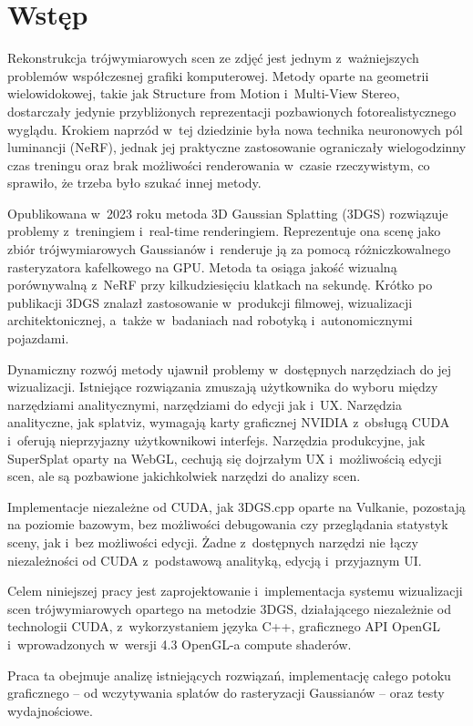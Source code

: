 \chapter*{Wstęp}

Rekonstrukcja trójwymiarowych scen ze zdjęć jest jednym z~ważniejszych
problemów współczesnej grafiki komputerowej. Metody oparte na geometrii
wielowidokowej, takie jak Structure from Motion i~Multi-View Stereo,
dostarczały jedynie przybliżonych reprezentacji pozbawionych
fotorealistycznego wyglądu. Krokiem naprzód w~tej dziedzinie była nowa
technika neuronowych pól luminancji (NeRF), jednak jej praktyczne
zastosowanie ograniczały wielogodzinny czas treningu oraz brak możliwości
renderowania w~czasie rzeczywistym, co sprawiło, że trzeba było szukać innej
metody.

Opublikowana w~2023 roku metoda 3D Gaussian Splatting (3DGS) rozwiązuje
problemy z~treningiem i~real-time renderingiem. Reprezentuje ona scenę jako
zbiór trójwymiarowych Gaussianów i~renderuje ją za pomocą różniczkowalnego
rasteryzatora kafelkowego na GPU. Metoda ta osiąga jakość wizualną
porównywalną z~NeRF przy kilkudziesięciu klatkach na sekundę. Krótko po
publikacji 3DGS znalazł zastosowanie w~produkcji filmowej, wizualizacji
architektonicznej, a~także w~badaniach nad robotyką i~autonomicznymi
pojazdami.

Dynamiczny rozwój metody ujawnił problemy w~dostępnych narzędziach do jej
wizualizacji. Istniejące rozwiązania zmuszają użytkownika do wyboru między
narzędziami analitycznymi, narzędziami do edycji jak i~UX. Narzędzia
analityczne, jak splatviz, wymagają karty graficznej NVIDIA z~obsługą CUDA
i~oferują nieprzyjazny użytkownikowi interfejs. Narzędzia produkcyjne, jak
SuperSplat oparty na WebGL, cechują się dojrzałym UX i~możliwością edycji
scen, ale są pozbawione jakichkolwiek narzędzi do analizy scen.

Implementacje niezależne od CUDA, jak 3DGS.cpp oparte na Vulkanie, pozostają
na poziomie bazowym, bez możliwości debugowania czy przeglądania statystyk
sceny, jak i~bez możliwości edycji. Żadne z~dostępnych narzędzi nie łączy
niezależności od CUDA z~podstawową analityką, edycją i~przyjaznym UI.

Celem niniejszej pracy jest zaprojektowanie i~implementacja systemu
wizualizacji scen trójwymiarowych opartego na metodzie 3DGS, działającego
niezależnie od technologii CUDA, z~wykorzystaniem języka C++, graficznego
API OpenGL i~wprowadzonych w~wersji 4.3 OpenGL-a compute shaderów.

Praca ta obejmuje analizę istniejących rozwiązań, implementację całego
potoku graficznego -- od wczytywania splatów do rasteryzacji Gaussianów --
oraz testy wydajnościowe.
